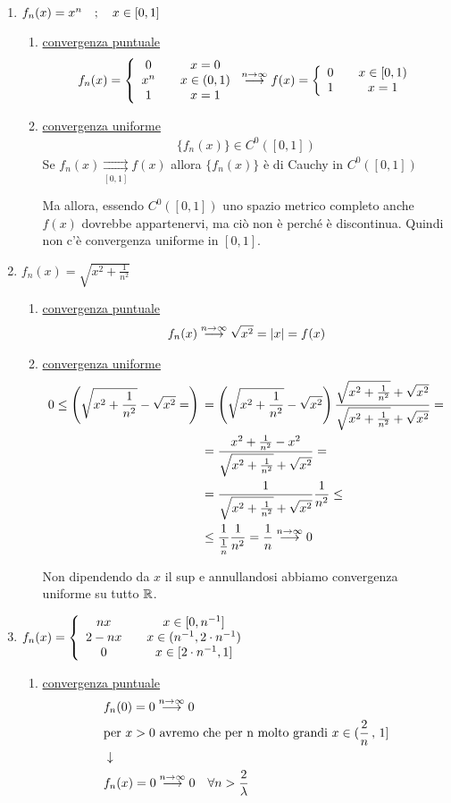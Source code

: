 \begin{enumerate}
	\item $f_n(x)=x^n \quad ; \quad x \in [0,1]$
	\begin{enumerate}
		\item \underline{convergenza puntuale}
		\begin{align}
		f_n(x) =  \left\{\begin{array}{cc} 0 \quad {}&x=0  \\ x^n \quad &x\in (0,1) \\ 1 \quad &x=1 \end{array}\right. \overset{n \rightarrow \infty}{\longrightarrow} f(x)=\left\{\begin{array}{cc} 0 \quad {}& x\in [0,1) \\ 1 \quad &x=1 \end{array}\right.
		\end{align}
		\item \underline{convergenza uniforme}
		\begin{align}
		\{f_n(x)\}\in C^0([0,1])
		\end{align}
		Se $f_n(x)\underset{[0,1]}{\rightrightarrows} f(x)$ allora $\{f_n(x)\}$ è di Cauchy in $C^0([0,1])$
		
		Ma allora, essendo  $C^0([0,1])$ uno spazio metrico completo anche $f(x)$ dovrebbe appartenervi, ma ciò non è perché è discontinua. Quindi non c'è convergenza uniforme in $[0,1]$.
	\end{enumerate}
	
	\newpage
	
	\item $f_n(x)= \sqrt{x^2 + \frac{1}{n^2}}$
		\begin{enumerate}
		\item \underline{convergenza puntuale}
		\begin{align}
		f_n(x) \overset{n \rightarrow \infty}{\longrightarrow} \sqrt{x^2}=|x| =f(x)
		\end{align}
		\item \underline{convergenza uniforme}
		\begin{align}
		0\leq \left( \sqrt{x^2 + \frac{1}{n^2}} - \sqrt{x^2}=  \right) {}&= \left( \sqrt{x^2 + \frac{1}{n^2}} - \sqrt{x^2}  \right) \frac{ \sqrt{x^2 + \frac{1}{n^2}} + \sqrt{x^2}  }{\sqrt{x^2 + \frac{1}{n^2}} + \sqrt{x^2}} = \nonumber \\ 
		&= \frac{x^2 + \frac{1}{n^2} - x^2}{\sqrt{x^2 + \frac{1}{n^2}} + \sqrt{x^2}} = \nonumber \\
		&= \frac{1}{\sqrt{x^2 + \frac{1}{n^2}} + \sqrt{x^2}}\frac{1}{n^2} \leq \nonumber \\
		&\leq \frac{1}{\frac{1}{n}}\frac{1}{n^2} = \frac{1}{n}\overset{n \rightarrow \infty}{\longrightarrow}0
		\end{align}
		
		Non dipendendo da $x$ il sup e annullandosi abbiamo convergenza uniforme su tutto $\mathbb{R}$.
		
	\end{enumerate}

	\item $f_n(x) = \left\{\begin{array}{cc} nx \quad {}&x\in[0,n^{-1}] \\ 2-nx \quad &x\in (n^{-1}, 2\cdot n^{-1}) \\ 0 \quad &x\in [2 \cdot n^{-1},1] \end{array}\right.$
	\begin{enumerate}
	\item \underline{convergenza puntuale}
	\begin{align}
	{}&f_n(0) = 0 \overset{n \rightarrow \infty}{\longrightarrow}0\\
	& \text{per }x>0 \text{ avremo che per n molto grandi } x\in (\frac{2}{n} \, , \, 1] \nonumber \\ &\downarrow \nonumber \\
	&f_n(x)=0 \overset{n \rightarrow \infty}{\longrightarrow}0 \quad \forall n>\frac{2}{\lambda}
	\end{align}
	

\end{enumerate}
\end{enumerate}
